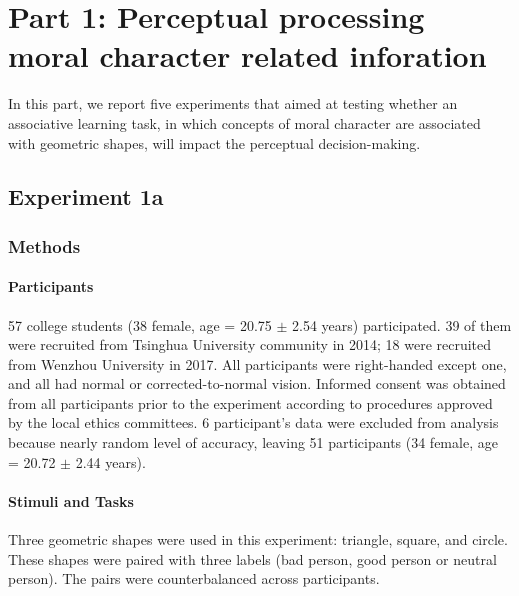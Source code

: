 \documentclass[
  english,
  man]{apa6}
\let\oldparagraph\paragraph
\renewcommand{\paragraph}[1]{\oldparagraph{#1}\mbox{}}
\begin{document}
\hypertarget{part-1-perceptual-processing-moral-character-related-inforation}{%
\section{Part 1: Perceptual processing moral character related inforation}\label{part-1-perceptual-processing-moral-character-related-inforation}}

In this part, we report five experiments that aimed at testing whether an associative learning task, in which concepts of moral character are associated with geometric shapes, will impact the perceptual decision-making.

\hypertarget{experiment-1a}{%
\subsection{Experiment 1a}\label{experiment-1a}}

\hypertarget{methods}{%
\subsubsection{Methods}\label{methods}}

\hypertarget{participants}{%
\paragraph{Participants}\label{participants}}

57 college students (38 female, age = 20.75 \(\pm\) 2.54 years) participated. 39 of them were recruited from Tsinghua University community in 2014; 18 were recruited from Wenzhou University in 2017. All participants were right-handed except one, and all had normal or corrected-to-normal vision. Informed consent was obtained from all participants prior to the experiment according to procedures approved by the local ethics committees. 6 participant's data were excluded from analysis because nearly random level of accuracy, leaving 51 participants (34 female, age = 20.72 \(\pm\) 2.44 years).

\hypertarget{stimuli-and-tasks}{%
\paragraph{Stimuli and Tasks}\label{stimuli-and-tasks}}

Three geometric shapes were used in this experiment: triangle, square, and circle. These shapes were paired with three labels (bad person, good person or neutral person). The pairs were counterbalanced across participants.
\end{document}
